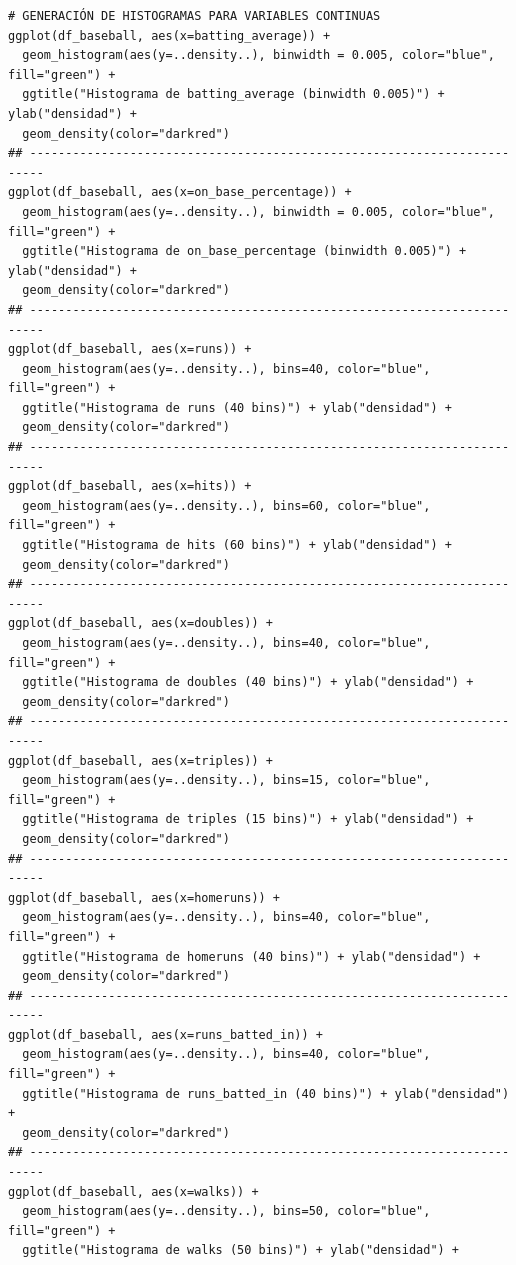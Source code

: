 \documentclass[a4paper,12pt, oneside]{book}
\begin{document}
\begin{verbatim}
# GENERACIÓN DE HISTOGRAMAS PARA VARIABLES CONTINUAS
ggplot(df_baseball, aes(x=batting_average)) + 
  geom_histogram(aes(y=..density..), binwidth = 0.005, color="blue", fill="green") +
  ggtitle("Histograma de batting_average (binwidth 0.005)") + ylab("densidad") + 
  geom_density(color="darkred")
## ------------------------------------------------------------------------
ggplot(df_baseball, aes(x=on_base_percentage)) + 
  geom_histogram(aes(y=..density..), binwidth = 0.005, color="blue", fill="green") +
  ggtitle("Histograma de on_base_percentage (binwidth 0.005)") + ylab("densidad") + 
  geom_density(color="darkred")
## ------------------------------------------------------------------------
ggplot(df_baseball, aes(x=runs)) + 
  geom_histogram(aes(y=..density..), bins=40, color="blue", fill="green") +
  ggtitle("Histograma de runs (40 bins)") + ylab("densidad") + 
  geom_density(color="darkred")
## ------------------------------------------------------------------------
ggplot(df_baseball, aes(x=hits)) + 
  geom_histogram(aes(y=..density..), bins=60, color="blue", fill="green") +
  ggtitle("Histograma de hits (60 bins)") + ylab("densidad") +
  geom_density(color="darkred")
## ------------------------------------------------------------------------
ggplot(df_baseball, aes(x=doubles)) + 
  geom_histogram(aes(y=..density..), bins=40, color="blue", fill="green") +
  ggtitle("Histograma de doubles (40 bins)") + ylab("densidad") + 
  geom_density(color="darkred")
## ------------------------------------------------------------------------
ggplot(df_baseball, aes(x=triples)) + 
  geom_histogram(aes(y=..density..), bins=15, color="blue", fill="green") +
  ggtitle("Histograma de triples (15 bins)") + ylab("densidad") + 
  geom_density(color="darkred")
## ------------------------------------------------------------------------
ggplot(df_baseball, aes(x=homeruns)) + 
  geom_histogram(aes(y=..density..), bins=40, color="blue", fill="green") +
  ggtitle("Histograma de homeruns (40 bins)") + ylab("densidad") + 
  geom_density(color="darkred")
## ------------------------------------------------------------------------
ggplot(df_baseball, aes(x=runs_batted_in)) + 
  geom_histogram(aes(y=..density..), bins=40, color="blue", fill="green") +
  ggtitle("Histograma de runs_batted_in (40 bins)") + ylab("densidad") + 
  geom_density(color="darkred")
## ------------------------------------------------------------------------
ggplot(df_baseball, aes(x=walks)) + 
  geom_histogram(aes(y=..density..), bins=50, color="blue", fill="green") +
  ggtitle("Histograma de walks (50 bins)") + ylab("densidad") + 

\end{verbatim}
\end{document}

